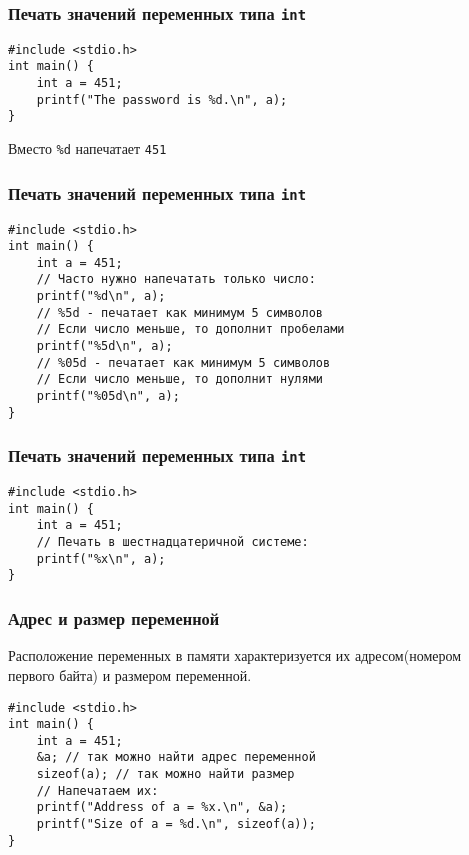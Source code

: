 \documentclass[12pt,pdf,hyperref={unicode}]{beamer}
\begin{document}
\begin{frame}[fragile]
\frametitle{Печать значений переменных типа \texttt{int}}
\begin{lstlisting}
#include <stdio.h>
int main() {
    int a = 451;
    printf("The password is %d.\n", a);
}
\end{lstlisting}
Вместо \texttt{\%d} напечатает \texttt{451}
\end{frame}

\begin{frame}[fragile]
\frametitle{Печать значений переменных типа \texttt{int}}
\begin{lstlisting}
#include <stdio.h>
int main() {
    int a = 451;
    // Часто нужно напечатать только число:
    printf("%d\n", a);
    // %5d - печатает как минимум 5 символов
    // Если число меньше, то дополнит пробелами
    printf("%5d\n", a);
    // %05d - печатает как минимум 5 символов
    // Если число меньше, то дополнит нулями
    printf("%05d\n", a);
}
\end{lstlisting}
\end{frame}

\begin{frame}[fragile]
\frametitle{Печать значений переменных типа \texttt{int}}

\begin{lstlisting}
#include <stdio.h>
int main() {
    int a = 451;
    // Печать в шестнадцатеричной системе:
    printf("%x\n", a);
}
\end{lstlisting}
\end{frame}

\begin{frame}[fragile]
\frametitle{Адрес и размер переменной}
Расположение переменных в памяти характеризуется их адресом(номером первого байта) и размером переменной.
\begin{lstlisting}
#include <stdio.h>
int main() {
    int a = 451;
    &a; // так можно найти адрес переменной
    sizeof(a); // так можно найти размер
    // Напечатаем их:
    printf("Address of a = %x.\n", &a);
    printf("Size of a = %d.\n", sizeof(a));
}
\end{lstlisting}
\end{frame}
\end{document}
